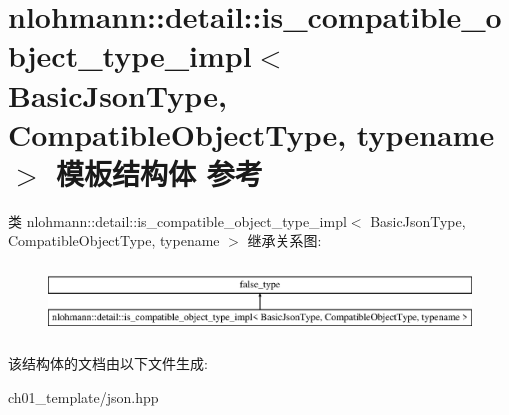 \hypertarget{structnlohmann_1_1detail_1_1is__compatible__object__type__impl}{}\section{nlohmann\+::detail\+::is\+\_\+compatible\+\_\+object\+\_\+type\+\_\+impl$<$ Basic\+Json\+Type, Compatible\+Object\+Type, typename $>$ 模板结构体 参考}
\label{structnlohmann_1_1detail_1_1is__compatible__object__type__impl}
类 nlohmann\+::detail\+::is\+\_\+compatible\+\_\+object\+\_\+type\+\_\+impl$<$ Basic\+Json\+Type, Compatible\+Object\+Type, typename $>$ 继承关系图\+:\begin{figure}[H]
\begin{center}
\leavevmode
\includegraphics[height=1.860465cm]{structnlohmann_1_1detail_1_1is__compatible__object__type__impl}
\end{center}
\end{figure}


该结构体的文档由以下文件生成\+:\begin{DoxyCompactItemize}
\item 
ch01\+\_\+template/json.\+hpp\end{DoxyCompactItemize}
